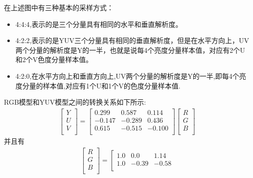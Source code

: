 \documentclass[UTF8,a4paper,10pt]{ctexart}
\begin{document}
\begin{flushleft}
        \hspace{2em}在上述图中有三种基本的采样方式：
        \begin{itemize}
            \item 4:4:4,表示的是三个分量具有相同的水平和垂直解析度。
            \item 4:2:2,表示的是YUV三个分量具有相同的垂直解析度，但是在水平方向上，UV两个分量的解析度是Y的一半，也就是说每4个亮度分量样本值，对应有2个U和2个V色度分量样本值。
            \item 4:2:0,在水平方向上和垂直方向上,UV两个分量的解析度是Y的一半,即每4个亮度分量的样本值,对应有1个U和1个V的色度分量样本值.
        \end{itemize}
        \hspace{2em}RGB模型和YUV模型之间的转换关系如下所示:
        \begin{eqnarray}
            \left[\begin{array}{c}
            Y \\
            U \\
            V \\
            \end{array}\right]=\left[\begin{array}{ccc}
                0.299 & 0.587 & 0.114\\
                -0.147 & -0.289 & 0.436\\
                0.615 & -0.515 & -0.100\\
            \end{array}\right]\left[\begin{array}{c}
                R \\
                G \\
                B \\
                \end{array}\right]\nonumber
        \end{eqnarray}
        并且有\\
        \begin{eqnarray}
            \left[\begin{array}{c}
            R \\
            G \\
            B \\
            \end{array}\right]=\left[\begin{array}{ccc}
                1.0 & 0.0 & 1.14\\
                1.0 & -0.39 & -0.58\\

\end{array}
\end{eqnarray}
\end{flushleft}
\end{document}
